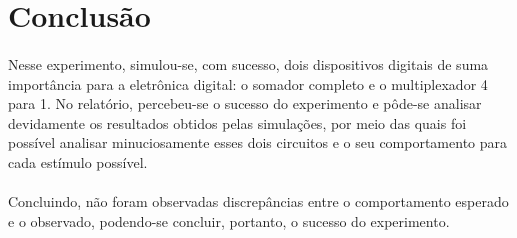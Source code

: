 \documentclass[a4paper,12pt]{article}
\begin{document}
\section{Conclusão}

\paragraph{}
Nesse experimento, simulou-se, com sucesso, dois dispositivos digitais de suma importância para a eletrônica digital: o somador completo e o multiplexador 4 para 1. No relatório, percebeu-se o sucesso do experimento e pôde-se analisar devidamente os resultados obtidos pelas simulações, por meio das quais foi possível analisar minuciosamente esses dois circuitos e o seu comportamento para cada estímulo possível.

\paragraph{}
Concluindo, não foram observadas discrepâncias entre o comportamento esperado e o observado, podendo-se concluir, portanto, o sucesso do experimento.
\end{document}
